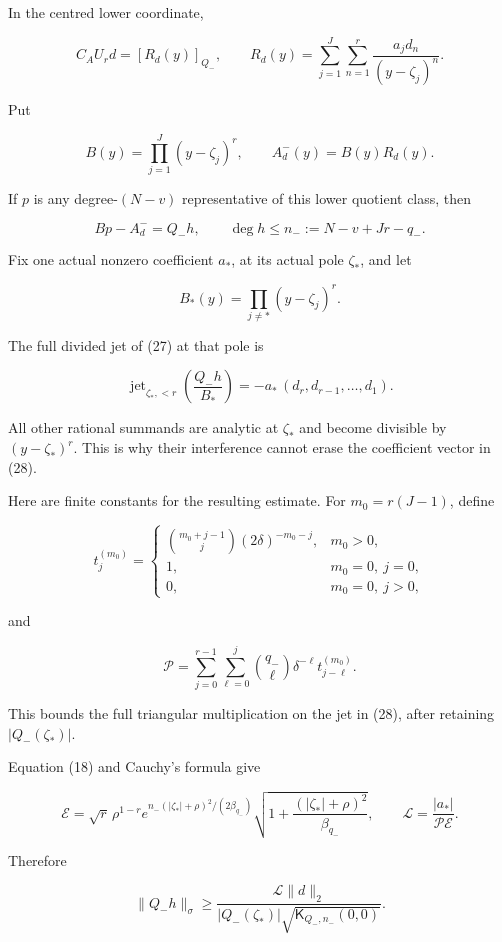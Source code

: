 \documentclass[11pt]{article}
\begin{document}
In the centred lower coordinate,

\[
C_AU_rd
=
\left[
R_d(y)
\right]_{Q_-},
\qquad
R_d(y)=
\sum_{j=1}^{J}\sum_{n=1}^{r}
\frac{a_jd_n}{(y-\zeta_j)^n}.
\tag{26}
\]

Put

\[
B(y)=\prod_{j=1}^{J}(y-\zeta_j)^r,
\qquad
A_d^-(y)=B(y)R_d(y).
\]

If \(p\) is any degree-\((N-v)\) representative of this lower quotient class, then

\[
Bp-A_d^-=Q_-h,
\qquad
\deg h\le n_-:=N-v+Jr-q_-.
\tag{27}
\]

Fix one actual nonzero coefficient \(a_*\), at its actual pole \(\zeta_*\), and let

\[
B_*(y)=\prod_{j\ne *}(y-\zeta_j)^r.
\]

The full divided jet of (27) at that pole is

\[
\boxed{
\operatorname{jet}_{\zeta_*,<r}
\left(\frac{Q_-h}{B_*}\right)
=
-a_*\,(d_r,d_{r-1},\ldots,d_1).
}
\tag{28}
\]

All other rational summands are analytic at \(\zeta_*\) and become divisible by \((y-\zeta_*)^r\). This is why their interference cannot erase the coefficient vector in (28).

Here are finite constants for the resulting estimate. For \(m_0=r(J-1)\), define

\[
t_j^{(m_0)}=
\begin{cases}
\displaystyle
\binom{m_0+j-1}{j}(2\delta)^{-m_0-j},&m_0>0,\\
1,&m_0=0,\ j=0,\\
0,&m_0=0,\ j>0,
\end{cases}
\]

and

\[
\mathcal P
=
\sum_{j=0}^{r-1}\sum_{\ell=0}^{j}
\binom{q_-}{\ell}\delta^{-\ell}
t_{j-\ell}^{(m_0)}.
\tag{29}
\]

This bounds the full triangular multiplication on the jet in (28), after retaining \(|Q_-(\zeta_*)|\).

Equation (18) and Cauchy's formula give

\[
\mathcal E
=
\sqrt r\,\rho^{1-r}
e^{n_-(|\zeta_*|+\rho)^2/(2\beta_{q_-})}
\sqrt{1+\frac{(|\zeta_*|+\rho)^2}{\beta_{q_-}}},
\qquad
\mathcal L=\frac{|a_*|}{\mathcal P\mathcal E}.
\tag{30}
\]

Therefore

\[
\|Q_-h\|_\sigma
\ge
\frac{\mathcal L\|d\|_2}
{|Q_-(\zeta_*)|
 \sqrt{\mathsf K_{Q_-,n_-}(0,0)}}.
\tag{31}
\]
\end{document}
